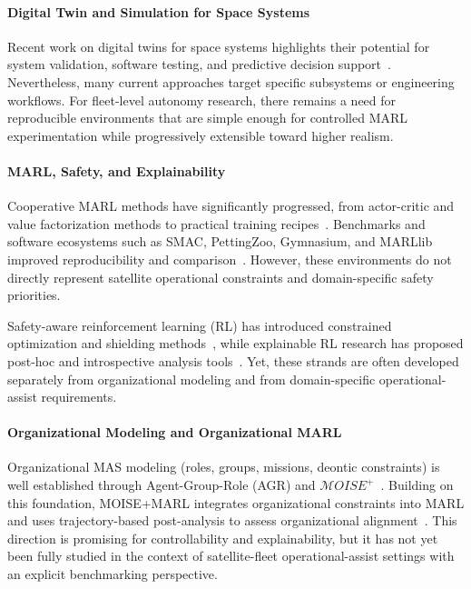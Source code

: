 \documentclass[sigconf]{aamas}
\begin{document}
\paragraph{Digital Twin and Simulation for Space Systems}
Recent work on digital twins for space systems highlights their potential for system validation, software testing, and predictive decision support~\cite{liu2024space_digital_twin_review,colagrossi2026spacecraft_dt}. Nevertheless, many current approaches target specific subsystems or engineering workflows. For fleet-level autonomy research, there remains a need for reproducible environments that are simple enough for controlled MARL experimentation while progressively extensible toward higher realism.

\paragraph{MARL, Safety, and Explainability}
Cooperative MARL methods have significantly progressed, from actor-critic and value factorization methods to practical training recipes~\cite{lowe2017multi,foerster2018counterfactual,rashid2018qmix,yu2021mappo}. Benchmarks and software ecosystems such as SMAC, PettingZoo, Gymnasium, and MARLlib improved reproducibility and comparison~\cite{samvelyan2019smac,terry2020pettingzoo,kwiatkowski2024,hu2021marlib}. However, these environments do not directly represent satellite operational constraints and domain-specific safety priorities.

Safety-aware reinforcement learning (RL) has introduced constrained optimization and shielding methods~\cite{garcia2015comprehensive,achiam2017cpo,alshiekh2018safe}, while explainable RL research has proposed post-hoc and introspective analysis tools~\cite{puiutta2020xrlsurvey,sequeira2020interestingness_xrl}. Yet, these strands are often developed separately from organizational modeling and from domain-specific operational-assist requirements.

\paragraph{Organizational Modeling and Organizational MARL}
Organizational MAS modeling (roles, groups, missions, deontic constraints) is well established through Agent-Group-Role (AGR) and $\mathcal{M}OISE^+$~\cite{ferber2003,Hubner2002,Hubner2007}. Building on this foundation, MOISE+MARL integrates organizational constraints into MARL and uses trajectory-based post-analysis to assess organizational alignment~\cite{soule2024moise_marl}. This direction is promising for controllability and explainability, but it has not yet been fully studied in the context of satellite-fleet operational-assist settings with an explicit benchmarking perspective.
\end{document}
